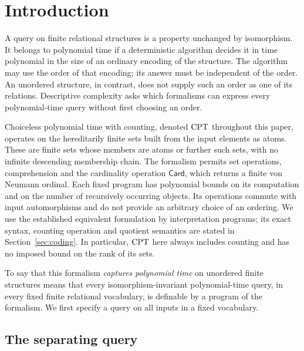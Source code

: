 \section{Introduction}\label{sec:introduction}

A query on finite relational structures is a property unchanged by
isomorphism. It belongs to polynomial time if a deterministic algorithm
decides it in time polynomial in the size of an ordinary encoding of the
structure. The algorithm may use the order of that encoding; its answer
must be independent of the order. An unordered structure, in contrast,
does not supply such an order as one of its relations. Descriptive
complexity asks which formalisms can express every polynomial-time query
without first choosing an order.

Choiceless polynomial time with counting, denoted $\mathrm{CPT}$ throughout this
paper, operates on the hereditarily finite sets built from the input
elements as atoms. These are finite sets whose members are atoms or
further such sets, with no infinite descending membership chain. The
formalism permits set operations, comprehension and the cardinality
operation $\mathsf{Card}$, which returns a finite von Neumann ordinal.
Each fixed program has polynomial bounds on its computation and on the
number of recursively occurring objects. Its operations commute with
input automorphisms and do not provide an arbitrary choice of an ordering.
We use the established equivalent formulation by interpretation programs;
its exact syntax, counting operation and quotient semantics are stated in
Section~\ref{sec:coding}. In particular, $\mathrm{CPT}$ here always includes
counting and has no imposed bound on the rank of its sets.

To say that this formalism \emph{captures polynomial time} on unordered
finite structures means that every isomorphism-invariant polynomial-time
query, in every fixed finite relational vocabulary, is definable by a
program of the formalism. We first specify a query on all inputs in a
fixed vocabulary.

\subsection{The separating query}\label{sec:query}

